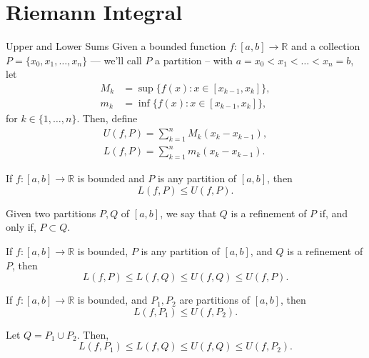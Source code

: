 \section{Riemann Integral}


\begin{defn}{Upper and Lower Sums}{}
	Given a bounded function \(f\colon [a, b] \to \mathbb{R}\) and a collection \(P = \{x_0, x_1, \dots, x_n\}\) --- we'll call \(P\) a partition -- with \(a = x_0 < x_1 < \dots < x_n = b\), let 
	\begin{align*}
		M_k &= \sup\{f(x) : x \in [x_{k-1}, x_k]\}, \\
		m_k &= \inf\{f(x) : x \in [x_{k-1}, x_k]\},
	\end{align*}
	for \(k \in \{1, \dots, n\}\). Then, define
	\begin{align*}
		U(f, P) = \sum_{k = 1}^n M_k(x_k - x_{k-1}), \\
		L(f, P) = \sum_{k = 1}^n m_k(x_k - x_{k-1}).
	\end{align*}
\end{defn}

\begin{prop}{}{}
	If \(f \colon [a, b] \to \mathbb{R}\)  is bounded and \(P\) is any partition of \([a, b]\), then \[
		L(f, P) \leq U(f, P).
	\]
\end{prop}

\begin{defn}{}{}
	Given two partitions \(P, Q\) of \([a, b]\), we say that \(Q\) is a refinement of \(P\) if, and only if, \(P \subset Q\).
\end{defn}

\begin{prop}{}{}
	If \(f \colon [a, b] \to \mathbb{R}\) is bounded, \(P\) is any partition of \([a, b]\), and \(Q\) is a refinement of \(P\), then \[
		L(f, P) \leq L(f, Q) \leq U(f, Q) \leq U(f, P).
	\]
\end{prop}

\begin{thm}{}{}
	If \(f \colon [a, b] \to \mathbb{R}\) is bounded, and \(P_1, P_2\) are partitions of \([a, b]\), then \[
		L(f, P_1) \leq U(f, P_2).
	\]
\end{thm}

\begin{dem}{}{}
	Let \(Q = P_1 \cup P_2\). Then, \[
		L(f, P_1) \leq L(f, Q) \leq U(f, Q) \leq U(f, P_2).
	\]
\end{dem}

